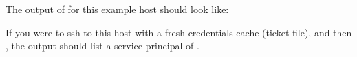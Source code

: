 \documentclass[letterpaper,10pt,english]{sphinxmanual}
\begin{document}
The output of  for this example host should look like:

%
\begin{sphinxVerbatim}[commandchars=\\\{\}]
  
 
 
    
\end{sphinxVerbatim}

If you were to ssh to this host with a fresh credentials cache (ticket
file), and then , the output should list a service
principal of .
\end{document}
